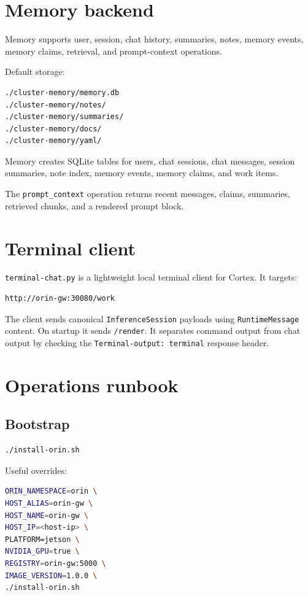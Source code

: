 \documentclass[11pt,a4paper]{article}
\begin{document}
\section{Memory backend}
Memory supports user, session, chat history, summaries, notes, memory events, memory claims, retrieval, and prompt-context operations.

Default storage:
\begin{lstlisting}
./cluster-memory/memory.db
./cluster-memory/notes/
./cluster-memory/summaries/
./cluster-memory/docs/
./cluster-memory/yaml/
\end{lstlisting}

Memory creates SQLite tables for users, chat sessions, chat messages, session summaries, note index, memory events, memory claims, and work items.

The \texttt{prompt\_context} operation returns recent messages, claims, summaries, retrieved chunks, and a rendered prompt block.

\section{Terminal client}
\texttt{terminal-chat.py} is a lightweight local terminal client for Cortex. It targets:
\begin{lstlisting}
http://orin-gw:30080/work
\end{lstlisting}

The client sends canonical \texttt{InferenceSession} payloads using \texttt{RuntimeMessage} content. On startup it sends \texttt{/render}. It separates command output from chat output by checking the \texttt{Terminal-output: terminal} response header.

\section{Operations runbook}
\subsection{Bootstrap}
\begin{lstlisting}[language=bash]
./install-orin.sh
\end{lstlisting}

Useful overrides:
\begin{lstlisting}[language=bash]
ORIN_NAMESPACE=orin \
HOST_ALIAS=orin-gw \
HOST_NAME=orin-gw \
HOST_IP=<host-ip> \
PLATFORM=jetson \
NVIDIA_GPU=true \
REGISTRY=orin-gw:5000 \
IMAGE_VERSION=1.0.0 \
./install-orin.sh
\end{lstlisting}
\end{document}
